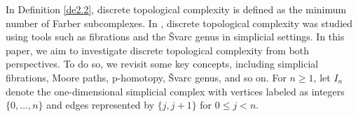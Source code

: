 \documentclass[preprint,11pt %
]{hjm1}
\newtheorem{theorem}{Theorem}[section]
\theoremstyle{definition}
\newtheorem{definition}[theorem]{Definition}
\begin{document}
In Definition \ref{de2.2}, discrete topological complexity is defined as the minimum number of Farber subcomplexes. In \cite{sim}, discrete topological complexity was studied using tools such as fibrations and the \v{S}varc genus in simplicial settings. In this paper, we aim to investigate discrete topological complexity from both perspectives. To do so, we revisit some key concepts, including simplicial fibrations, Moore paths, p-homotopy, \v{S}varc genus, and so on.
For $n\geq 1$, let $I_n$ denote the one-dimensional simplicial complex with vertices labeled as integers $\lbrace 0 ,...,n\rbrace $ and  edges represented by $\lbrace j,j + 1\rbrace $ for $0 \leq j < n$. 
\end{document}
